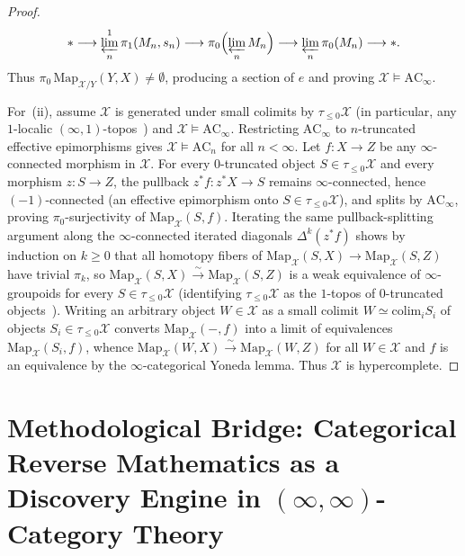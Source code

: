 \begin{proof}
\[
  * \longrightarrow \varprojlim^1_n \pi_1(M_n, s_n) \longrightarrow \pi_0\Bigl(\varprojlim_n M_n\Bigr) \longrightarrow \varprojlim_n \pi_0(M_n) \longrightarrow *.
\]
Thus $\pi_0\,\mathrm{Map}_{\mathcal{X}/Y}(Y, X) \neq \emptyset$, producing a section of $e$ and proving $\mathcal{X} \models \mathrm{AC}_\infty$.

For~(ii), assume $\mathcal{X}$ is generated under small colimits by $\tau_{\le 0}\mathcal{X}$ (in particular, any $1$-localic $(\infty, 1)$-topos~\cite[\S 6.4.5]{Lurie09}) and $\mathcal{X} \models \mathrm{AC}_\infty$. Restricting $\mathrm{AC}_\infty$ to $n$-truncated effective epimorphisms gives $\mathcal{X} \models \mathrm{AC}_n$ for all $n < \infty$. Let $f : X \to Z$ be any $\infty$-connected morphism in $\mathcal{X}$. For every $0$-truncated object $S \in \tau_{\le 0}\mathcal{X}$ and every morphism $z : S \to Z$, the pullback $z^* f : z^* X \to S$ remains $\infty$-connected, hence $(-1)$-connected (an effective epimorphism onto $S \in \tau_{\le 0}\mathcal{X}$), and splits by $\mathrm{AC}_\infty$, proving $\pi_0$-surjectivity of $\mathrm{Map}_{\mathcal{X}}(S, f)$. Iterating the same pullback-splitting argument along the $\infty$-connected iterated diagonals $\Delta^k(z^* f)$ shows by induction on $k \ge 0$ that all homotopy fibers of $\mathrm{Map}_{\mathcal{X}}(S, X) \to \mathrm{Map}_{\mathcal{X}}(S, Z)$ have trivial $\pi_k$, so $\mathrm{Map}_{\mathcal{X}}(S, X) \xrightarrow{\sim} \mathrm{Map}_{\mathcal{X}}(S, Z)$ is a weak equivalence of $\infty$-groupoids for every $S \in \tau_{\le 0}\mathcal{X}$ (identifying $\tau_{\le 0}\mathcal{X}$ as the $1$-topos of $0$-truncated objects~\cite[Prop.~5.5.6.28]{Lurie09}). Writing an arbitrary object $W \in \mathcal{X}$ as a small colimit $W \simeq \mathrm{colim}_i S_i$ of objects $S_i \in \tau_{\le 0}\mathcal{X}$ converts $\mathrm{Map}_{\mathcal{X}}(-, f)$ into a limit of equivalences $\mathrm{Map}_{\mathcal{X}}(S_i, f)$, whence $\mathrm{Map}_{\mathcal{X}}(W, X) \xrightarrow{\sim} \mathrm{Map}_{\mathcal{X}}(W, Z)$ for all $W \in \mathcal{X}$ and $f$ is an equivalence by the $\infty$-categorical Yoneda lemma. Thus $\mathcal{X}$ is hypercomplete.
\end{proof}

\section{Methodological Bridge: Categorical Reverse Mathematics as a Discovery Engine in $(\infty,\infty)$-Category Theory}\label{subsec:crm-discovery-engine-inf-inf}

